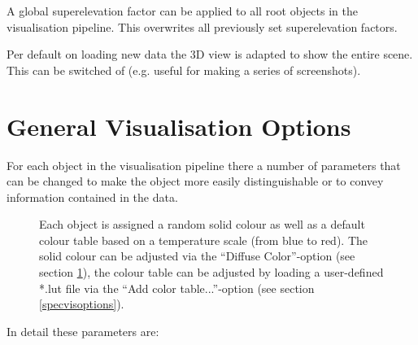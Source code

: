 A global superelevation factor can be applied to all root objects in the visualisation pipeline. This overwrites all previously set superelevation factors.

Per default on loading new data the 3D view is adapted to show the entire scene. This can be switched of (e.g. useful for making a series of screenshots).

\section{General Visualisation Options}
\label{genvisoptions}

For each object in the visualisation pipeline there a number of parameters that can be changed to make the object more easily distinguishable or to convey information contained in the data.

\begin{figure}[tb]
\begin{center}
\enspace
{}\enspace
{}
\end{center}
\caption{Each object is assigned a random solid colour as well as a default colour table based on a temperature scale (from blue to red). The solid colour can be adjusted via the ``Diffuse Color''-option (see section \ref{genvisoptions}), the colour table can be adjusted by loading a user-defined *.lut file via the ``Add color table...''-option (see section \ref{specvisoptions}).} \label{fig:colours}
\end{figure}

In detail these parameters are:

